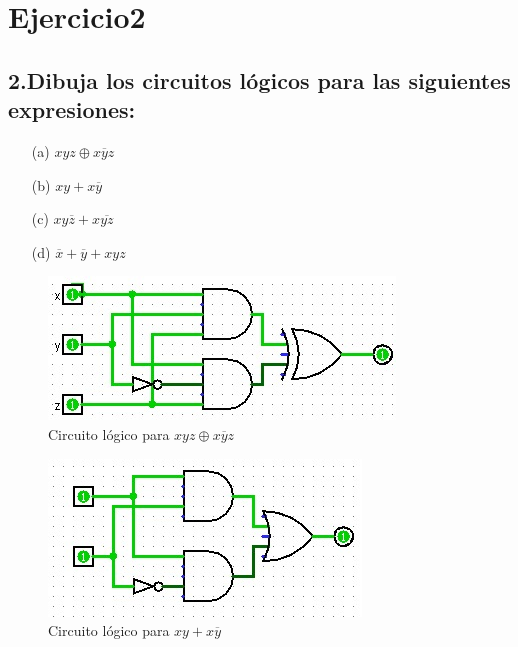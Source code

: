\chapter*{Ejercicio2}

\section{2.Dibuja los circuitos lógicos para las siguientes expresiones:}

\begin{enumerate}
    \item[(a)] $xyz \oplus x\overline{y}z$
    \item[(b)] $xy + x\overline{y}$
    \item[(c)] $xy\overline{z} + x\overline{yz}$
    \item[(d)] $\overline{x} + \overline{y} + xyz$
    
\end{enumerate}
 \begin{figure}[h!]
    \centering
    \includegraphics[width=\textwidth]{recursos/Ejercicio2/circuito_a.png}
    \caption{Circuito lógico para $xyz \oplus x\overline{y}z$}
\end{figure}
\newpage

\begin{figure}[h!]
    \centering
    \includegraphics[width=\textwidth]{recursos/Ejercicio2/circuito_b.png}
    \caption{Circuito lógico para $xy + x\overline{y}$}
\end{figure}

